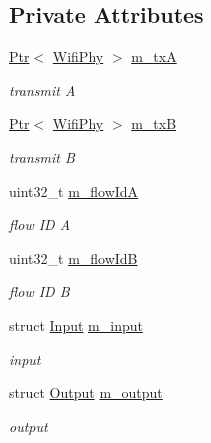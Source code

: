 \subsection*{Private Attributes}
\begin{DoxyCompactItemize}
\item 
\hyperlink{classns3_1_1Ptr}{Ptr}$<$ \hyperlink{classns3_1_1WifiPhy}{Wifi\+Phy} $>$ \hyperlink{classCollisionExperiment_ae978d49d2fd4c040217934ed24852f53}{m\+\_\+txA}
\begin{DoxyCompactList}\small\item\em transmit A \end{DoxyCompactList}\item 
\hyperlink{classns3_1_1Ptr}{Ptr}$<$ \hyperlink{classns3_1_1WifiPhy}{Wifi\+Phy} $>$ \hyperlink{classCollisionExperiment_aa84222ca77a56ddb4cc28475f64a57b0}{m\+\_\+txB}
\begin{DoxyCompactList}\small\item\em transmit B \end{DoxyCompactList}\item 
uint32\+\_\+t \hyperlink{classCollisionExperiment_aea147790587130f8326370d34589b336}{m\+\_\+flow\+IdA}
\begin{DoxyCompactList}\small\item\em flow ID A \end{DoxyCompactList}\item 
uint32\+\_\+t \hyperlink{classCollisionExperiment_a39fe5cdf6536df540d308abba68c2c0a}{m\+\_\+flow\+IdB}
\begin{DoxyCompactList}\small\item\em flow ID B \end{DoxyCompactList}\item 
struct \hyperlink{structCollisionExperiment_1_1Input}{Input} \hyperlink{classCollisionExperiment_a735b0105c62702501ae9e4b473795682}{m\+\_\+input}
\begin{DoxyCompactList}\small\item\em input \end{DoxyCompactList}\item 
struct \hyperlink{structCollisionExperiment_1_1Output}{Output} \hyperlink{classCollisionExperiment_a5a7408505c713d02596f1657848e7666}{m\+\_\+output}
\begin{DoxyCompactList}\small\item\em output \end{DoxyCompactList}\end{DoxyCompactItemize}


